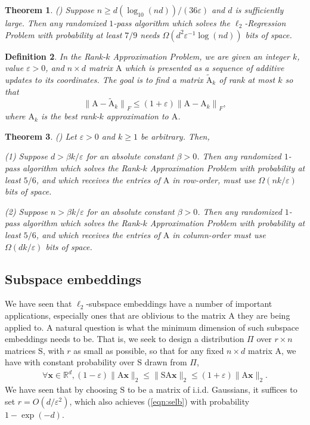 \documentclass[11pt]{article}
\newtheorem{theorem}{Theorem}
\newtheorem{definition}[theorem]{Definition}
\newcommand{\mat}[1]{{\ensuremath{\bm{\mathrm{#1}}}}}
\def\matA{\mat{A}}
\def\matS{\mat{S}}
\def\x{{\mathbf x}}
\newcommand{\normF}[1]{{\| #1 \|}_F}
\newcommand{\eps}{\varepsilon}
\begin{document}
\begin{theorem}(\cite{CW09})
Suppose $n \geq d (\log_{10} (nd))/(36\varepsilon)$ and $d$ is sufficiently large. Then any 
randomized $1$-pass algorithm which solves the $\ell_2$-Regression Problem with 
probability at least $7/9$ needs $\Omega(d^2\varepsilon^{-1}\log (nd))$ bits of space.
\end{theorem}

\begin{definition}\label{prob:lowrank}
In the {\it Rank-$k$ Approximation Problem}, 
we are given an integer $k$, value $\varepsilon>0$, and $n\times d$ matrix $\matA$ which is presented
as a sequence of additive updates to its coordinates. The goal is to 
find a matrix $\tilde \matA_k$ of rank at most $k$ so that
\[
\normF{\matA-\tilde \matA_k} \le (1+\varepsilon)\normF{\matA-\matA_k},
\]
where $\matA_k$ is the best rank-$k$ approximation to $\matA$.
\end{definition}

\begin{theorem}\label{thm:rankLB}(\cite{CW09})
Let $\varepsilon > 0$ and $k \geq 1$ be arbitrary. Then, 

(1) Suppose $d >\beta k/\varepsilon$ for an absolute constant $\beta> 0$. Then any
randomized $1$-pass algorithm which solves the Rank-$k$ Approximation Problem with 
probability at least $5/6$, and which receives
the entries of $\matA$ in row-order, must use $\Omega(nk/\varepsilon)$ bits of space.

(2) Suppose $n > \beta k/\varepsilon$ for an absolute constant $\beta > 0$. Then any
randomized $1$-pass algorithm which solves the Rank-$k$ Approximation Problem with
probability at least $5/6$, and which receives
the entries of $\matA$ in column-order must use $\Omega(dk/\varepsilon)$ bits of space.

\end{theorem}

\subsection{Subspace embeddings}\label{sec:seLB}
We have seen that $\ell_2$-subspace embeddings have a number of important applications, 
especially ones that are oblivious to the matrix $\matA$ they are being applied to. A natural
question is what the minimum dimension of such subspace embeddings needs to be. That is,
we seek to design a distribution $\Pi$ over $r \times n$ matrices $\matS$, with $r$ as small
as possible, so that for any
fixed $n \times d$ matrix $\matA$, we have with constant probability over $\matS$ drawn from $\Pi$,
\begin{eqnarray}\label{eqn:selb}
\forall \x \in \mathbb{R}^d, (1-\eps)\|\matA \x\|_2 \leq \|\matS \matA\x\|_2 \leq (1+\eps)\|\matA \x\|_2.
\end{eqnarray}
We have seen that by choosing $\matS$ to be a matrix of i.i.d. Gaussians, it suffices to set
$r = O(d/\eps^2)$, which also achieves (\ref{eqn:selb}) with probability $1-\exp(-d)$.
\end{document}
